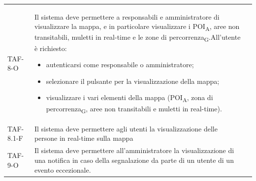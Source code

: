 \begin{longtable}{ >{\centering}p{} >{}p{}
		>{\centering}p{}}
	TAF-8-O & Il sistema deve permettere a responsabili e amministratore di visualizzare la mappa, e in particolare visualizzare i POI\textsubscript{A}, aree non transitabili, muletti in real-time e le zone di percorrenza\textsubscript{G}.\newline All'utente è richiesto:\begin{itemize} \item autenticarsi come responsabile o amministratore; \item selezionare il pulsante per la visualizzazione della mappa; \item visualizzare i vari elementi della mappa (POI\textsubscript{A}, zona di percorrenza\textsubscript{G}, aree non transitabili e muletti in real-time). \end{itemize} & 0\tabularnewline
	TAF-8.1-F & Il sistema deve permettere agli utenti la visualizzazione delle persone in real-time sulla mappa & 0\tabularnewline
	

	TAF-9-O & Il sistema deve permettere all'amministratore la visualizzazione di una notifica in caso della segnalazione da parte di un utente di un evento eccezionale. & 0\tabularnewline


\end{longtable}

